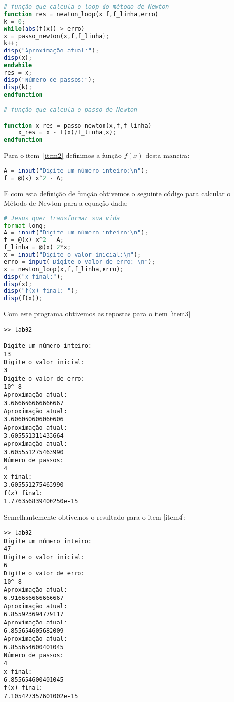 \documentclass[a4paper]{article}
\begin{document}
\begin{lstlisting}[language = octave]
# função que calcula o loop do método de Newton
function res = newton_loop(x,f,f_linha,erro)
k = 0;
while(abs(f(x)) > erro)
x = passo_newton(x,f,f_linha);
k++;
disp("Aproximação atual:");
disp(x);
endwhile
res = x;
disp("Número de passos:");
disp(k);
endfunction

# função que calcula o passo de Newton

function x_res = passo_newton(x,f,f_linha)
	x_res = x - f(x)/f_linha(x);
endfunction
\end{lstlisting}

Para o item~\ref{item2} definimos a função $f(x)$ desta maneira:

\begin{lstlisting}[language = octave]
A = input("Digite um número inteiro:\n");
f = @(x) x^2 - A;
\end{lstlisting}

E com esta definição de função obtivemos o seguinte código para calcular o Método de Newton para a equação dada:
\begin{lstlisting}[language = octave]
# Jesus quer transformar sua vida
format long;
A = input("Digite um número inteiro:\n");
f = @(x) x^2 - A;
f_linha = @(x) 2*x;
x = input("Digite o valor inicial:\n");
erro = input("Digite o valor de erro: \n"); 
x = newton_loop(x,f,f_linha,erro);
disp("x final:");
disp(x);
disp("f(x) final: ");
disp(f(x));
\end{lstlisting}

Com este programa obtivemos as repostas para o item \ref{item3}
\begin{lstlisting}
>> lab02

Digite um número inteiro:
13
Digite o valor inicial:
3
Digite o valor de erro:
10^-8
Aproximação atual:
3.666666666666667
Aproximação atual:
3.606060606060606
Aproximação atual:
3.605551311433664
Aproximação atual:
3.605551275463990
Número de passos:
4
x final:
3.605551275463990
f(x) final:
1.776356839400250e-15
\end{lstlisting}

Semelhantemente obtivemos o resultado para o item \ref{item4}:
\begin{lstlisting}
>> lab02
Digite um número inteiro:
47
Digite o valor inicial:
6
Digite o valor de erro:
10^-8
Aproximação atual:
6.916666666666667
Aproximação atual:
6.855923694779117
Aproximação atual:
6.855654605682009
Aproximação atual:
6.855654600401045
Número de passos:
4
x final:
6.855654600401045
f(x) final:
7.105427357601002e-15
\end{lstlisting}
\end{document}
